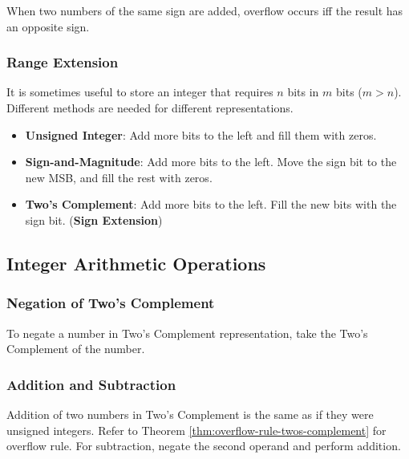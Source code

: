 \begin{theorem}\label{thm:overflow-rule-twos-complement}
    When two numbers of the same sign are added, overflow occurs iff the result has an opposite sign.
\end{theorem}

\subsubsection{Range Extension}

It is sometimes useful to store an integer that requires $n$ bits in $m$ bits ($m>n$). Different
methods are needed for different representations.

\begin{itemize}
    \item \textbf{Unsigned Integer}: Add more bits to the left and fill them with zeros.
    \item \textbf{Sign-and-Magnitude}: Add more bits to the left. Move the sign bit to the new MSB,
            and fill the rest with zeros.
    \item \textbf{Two's Complement}: Add more bits to the left. Fill the new bits with the sign bit.
            (\textbf{Sign Extension})
\end{itemize}

\subsection{Integer Arithmetic Operations}

\subsubsection{Negation of Two's Complement}

\begin{definition}
To negate a number in Two's Complement representation, take the Two's Complement of the number.
\end{definition}

\subsubsection{Addition and Subtraction}

Addition of two numbers in Two's Complement is the same as if they were unsigned integers.
Refer to Theorem \ref{thm:overflow-rule-twos-complement} for overflow rule. For subtraction,
negate the second operand and perform addition.

